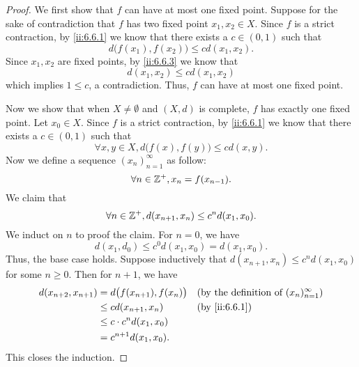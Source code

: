 \begin{proof}
  We first show that \(f\) can have at most one fixed point.
  Suppose for the sake of contradiction that \(f\) has two fixed point \(x_1, x_2 \in X\).
  Since \(f\) is a strict contraction, by \cref{ii:6.6.1} we know that there exists a \(c \in (0, 1)\) such that
  \[
    d\big(f(x_1), f(x_2)\big) \leq c d(x_1, x_2).
  \]
  Since \(x_1, x_2\) are fixed points, by \cref{ii:6.6.3} we know that
  \[
    d(x_1, x_2) \leq c d(x_1, x_2)
  \]
  which implies \(1 \leq c\), a contradiction.
  Thus, \(f\) can have at most one fixed point.

  Now we show that when \(X \neq \emptyset\) and \((X, d)\) is complete, \(f\) has exactly one fixed point.
  Let \(x_0 \in X\).
  Since \(f\) is a strict contraction, by \cref{ii:6.6.1} we know that there exists a \(c \in (0, 1)\) such that
  \[
    \forall x, y \in X, d\big(f(x), f(y)\big) \leq c d(x, y).
  \]
  Now we define a sequence \((x_n)_{n = 1}^\infty\) as follow:
  \[
    \forall n \in \mathbb{Z}^+, x_n = f(x_{n - 1}).
  \]
  We claim that
  \[
    \forall n \in \mathbb{Z}^+, d(x_{n + 1}, x_n) \leq c^n d(x_1, x_0).
  \]
  We induct on \(n\) to proof the claim.
  For \(n = 0\), we have
  \[
    d(x_1, d_0) \leq c^0 d(x_1, x_0) = d(x_1, x_0).
  \]
  Thus, the base case holds.
  Suppose inductively that \(d(x_{n + 1}, x_n) \leq c^n d(x_1, x_0)\) for some \(n \geq 0\).
  Then for \(n + 1\), we have
  \begin{align*}
    d(x_{n + 2}, x_{n + 1}) & = d\big(f(x_{n + 1}), f(x_n)\big) &  & \text{(by the definition of \((x_n)_{n = 1}^\infty\))} \\
                            & \leq c d(x_{n + 1}, x_n)          &  & \by{ii:6.6.1}                                          \\
                            & \leq c \cdot c^n d(x_1, x_0)                                                                  \\
                            & = c^{n + 1} d(x_1, x_0).
  \end{align*}
  This closes the induction.


\end{proof}
